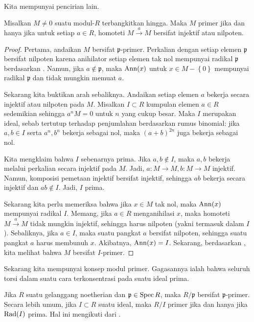 Kita mempunyai pencirian lain.

\begin{proposition} \label{whenisprimary2}
Misalkan $M \neq 0$ suatu modul-$R$ terbangkitkan hingga. Maka $M$ primer jika dan
hanya jika untuk setiap $a \in
R$, homoteti $ M \stackrel{a}{\to} M$ bersifat injektif atau nilpoten.
\end{proposition}
\begin{proof} 
Pertama, andaikan $M$ bersifat $\mathfrak{p}$-primer. Perkalian dengan setiap elemen
$\mathfrak{p}$ bersifat nilpoten karena anihilator setiap elemen tak nol mempunyai
radikal $\mathfrak{p}$ berdasarkan . Namun, jika $a \notin \mathfrak{p}$, maka $\operatorname{Ann}(x)$ untuk
$x \in M - \left\{0\right\}$ mempunyai radikal $\mathfrak{p}$ dan tidak mungkin memuat $a$. 

Sekarang kita buktikan arah sebaliknya. Andaikan setiap elemen $a$ bekerja secara injektif atau nilpoten pada $M$.
Misalkan $I \subset R$ kumpulan elemen $a \in R$ sedemikian sehingga $a^n M = 0$
untuk $n$ yang cukup besar. Maka $I$ merupakan ideal, sebab tertutup terhadap penjumlahan berdasarkan
rumus binomial: jika $a, b \in I$ serta $a^n, b^n$ bekerja sebagai nol, maka $(a+b)^{2n}$
juga bekerja sebagai nol.


Kita mengklaim bahwa $I$ sebenarnya prima. Jika $a,b \notin I$, maka $a,b$ bekerja melalui
perkalian secara injektif pada $M$. Jadi, $a: M \to M, b: M \to M$ injektif.
Namun, komposisi pemetaan injektif bersifat injektif, sehingga $ab$ bekerja secara injektif dan
$ab \notin I$. Jadi, $I$ prima.

Sekarang kita perlu memeriksa bahwa jika $x \in M$ tak nol, maka $\operatorname{Ann}(x)$ mempunyai radikal
$I$. Memang, jika $a \in R$ menganihilasi $x$,
maka homoteti $M \stackrel{a}{\to} M$ tidak mungkin injektif, sehingga harus
nilpoten (yakni termasuk dalam $I$). Sebaliknya, jika $a \in I$, maka suatu pangkat $a$
bersifat nilpoten, sehingga suatu pangkat $a$ 
harus membunuh $x$. 
Akibatnya, $\operatorname{Ann}(x) = I$. Sekarang, berdasarkan , kita melihat
bahwa $M$ bersifat $I$-primer.
\end{proof} 

Sekarang kita mempunyai konsep modul primer. Gagasannya ialah bahwa seluruh torsi
dalam suatu cara terkonsentrasi pada suatu ideal prima.

\begin{example} 
Jika $R$ suatu gelanggang noetherian dan $\mathfrak{p} \in \operatorname{Spec} R$, maka
$R/\mathfrak{p}$ bersifat $\mathfrak{p}$-primer. Secara lebih umum, jika $I \subset R$
suatu ideal, maka $R/I$ primer jika dan hanya jika $\operatorname{Rad}(I) $ prima. Hal ini
mengikuti dari .
\end{example} 

